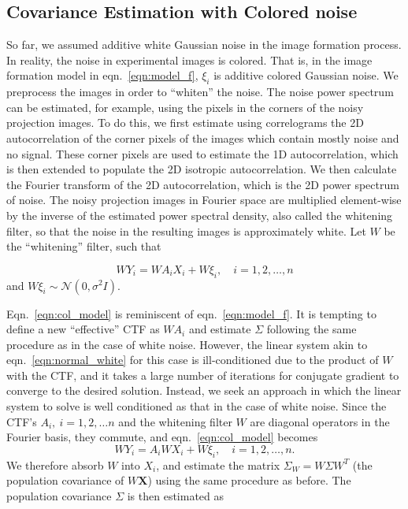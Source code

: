 \subsection{Covariance Estimation with Colored noise}
\label{sec:covest_col}
So far, we assumed additive white Gaussian noise in the image formation 
process. In reality, the noise in experimental images
is colored. That is, in the image formation model in eqn.\ \ref{eqn:model_f},
$\xi_i$ is additive colored Gaussian noise. 
We preprocess the images in order to ``whiten'' the noise.
The noise power spectrum can be estimated, for example, using the pixels in the corners of the noisy projection images.
To do this, we first estimate using correlograms the 2D autocorrelation
of the corner pixels of the images which contain mostly noise and no signal. These corner
pixels are used to estimate the 1D autocorrelation, which is then extended to populate the 2D isotropic
autocorrelation. We then calculate the Fourier transform of the 2D autocorrelation, 
which is the 2D power spectrum of noise.
The noisy projection images in 
Fourier space are multiplied element-wise by the inverse of the estimated 
power spectral density, also called the whitening filter, so that the noise in the resulting images 
is approximately white.
Let $W$ be the ``whitening'' filter, such that

\begin{equation}
 WY_i=WA_{i}X_i + W\xi_i, \quad i=1,2,\ldots,n
 \label{eqn:col_model}
\end{equation}
and $W \xi_i \sim \mathcal{N}(0,\sigma^2 I)$. 

Eqn.\ \ref{eqn:col_model} is reminiscent of eqn.\ \ref{eqn:model_f}. It is tempting to define a new 
``effective'' CTF as $WA_{i}$ and estimate
$\Sigma$ following the same procedure as in the case of white noise. However, 
the linear system akin to eqn.\ \ref{eqn:normal_white} for this case
is ill-conditioned due to the product of $W$ with the CTF, and it 
takes a large number of iterations for conjugate gradient 
to converge to the desired solution. Instead, we seek an approach in which the 
linear system to solve is well conditioned as that
in the case of white noise.
Since the CTF's $A_i,\ i=1,2, \ldots n$ 
and the whitening filter $W$ are diagonal operators in the Fourier basis, they 
commute, and eqn.\ \ref{eqn:col_model} becomes
\begin{equation}
WY_i=A_{i}WX_i + W\xi_i, \quad i=1,2,\ldots,n.
\label{eqn:model_col}
\end{equation}
We therefore 
absorb $W$ into $X_i$, and estimate the matrix $\Sigma_W = 
W\Sigma W^T$ (the population covariance of $W \textbf{X}$) using the same procedure as before.
The population covariance $\Sigma$ is then estimated as

